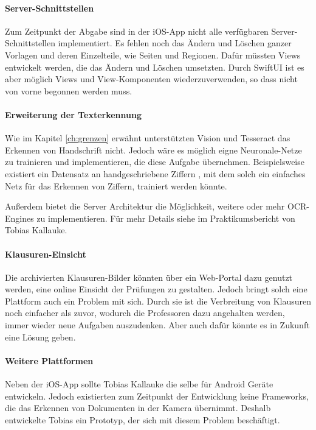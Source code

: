 \documentclass[nomenclature, oneside, 150]{HSMW-Thesis}
\begin{document}
	\paragraph{Server-Schnittstellen} Zum Zeitpunkt der Abgabe sind in der iOS-App nicht alle verfügbaren Server-Schnittstellen implementiert. Es fehlen noch das Ändern und Löschen ganzer Vorlagen und deren Einzelteile, wie Seiten und Regionen. Dafür müssten Views entwickelt werden, die das Ändern und Löschen umsetzten. Durch SwiftUI ist es aber möglich Views und View-Komponenten wiederzuverwenden, so dass nicht von vorne begonnen werden muss. 		
	
	\paragraph{Erweiterung der Texterkennung} Wie im Kapitel \ref{ch:grenzen} erwähnt unterstützten Vision und Tesseract das Erkennen von Handschrift nicht. Jedoch wäre es möglich eigne Neuronale-Netze zu trainieren und implementieren, die diese Aufgabe übernehmen. Beispielsweise existiert ein Datensatz an handgeschriebene Ziffern , mit dem solch ein einfaches Netz für das Erkennen von Ziffern, trainiert werden könnte. 
	
		Außerdem bietet die Server Architektur die Möglichkeit, weitere oder mehr OCR-Engines zu implementieren. Für mehr Details siehe im Praktikumsbericht von Tobias Kallauke.
	
	\paragraph{Klausuren-Einsicht} Die archivierten Klausuren-Bilder könnten über ein Web-Portal dazu genutzt werden, eine online Einsicht der Prüfungen zu gestalten. Jedoch bringt solch eine Plattform auch ein Problem mit sich. Durch sie ist die Verbreitung von Klausuren noch einfacher als zuvor, wodurch die Professoren dazu angehalten werden, immer wieder neue Aufgaben auszudenken. Aber auch dafür könnte es in Zukunft eine Lösung geben. 
	
	\paragraph{Weitere Plattformen} Neben der iOS-App sollte Tobias Kallauke die selbe für Android Geräte entwickeln. Jedoch existierten zum Zeitpunkt der Entwicklung keine Frameworks, die das Erkennen von Dokumenten in der Kamera übernimmt. Deshalb entwickelte Tobias ein Prototyp, der sich mit diesem Problem beschäftigt. 
	
\end{document}
